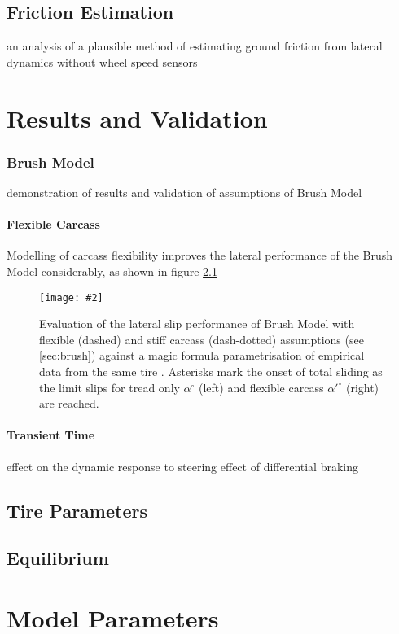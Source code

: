\documentclass[12pt,a4paper]{report}
\newcommand{\figura}[5][htbp]{
\begin{figure}[#1]
\begin{center}
\texttt{[image: \#2]}
\caption{#4}\label{#5}
\end{center}
\end{figure}
}
\begin{document}
\section{Friction Estimation}
an analysis of a plausible method of estimating ground friction from lateral dynamics without wheel speed sensors
\chapter{Results and Validation} \label{c:rev}
\subsection{Brush Model}
demonstration of results and validation of assumptions of Brush Model
\subsubsection*{Flexible Carcass}
Modelling of carcass flexibility improves the lateral performance of the Brush Model considerably, as shown in figure \ref{fig:flexcarisgood}
\figura{pix/4_14_flexcarisgood.jpg}{width=\textwidth}{Evaluation of the lateral slip performance of Brush Model with flexible (dashed) and stiff carcass (dash-dotted) assumptions (see \ref{sec:brush}) against a magic formula parametrisation of empirical data from the same tire \citep{sven09}. Asterisks mark the onset of total sliding as the limit slips for tread only $\alpha^\circ $ (left) and flexible carcass $\alpha'^\circ $ (right) are reached.}{fig:flexcarisgood}
\subsubsection*{Transient Time}
effect on the dynamic response to steering
effect of differential braking
\section{Tire Parameters}
\section{Equilibrium}
\appendix
\chapter{Model Parameters} \label{apx:param}
\end{document}
